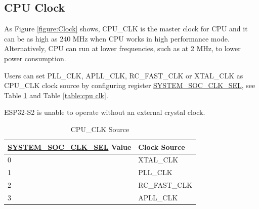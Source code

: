 \documentclass[main\_\_EN.tex]{subfiles}
\begin{document}
\subsection{CPU Clock}
\label{sec:cpu-clock}
As Figure \ref{figure:Clock} shows, CPU\_CLK is the master clock for CPU and it can be as high as 240 MHz when CPU works in high performance mode. Alternatively, CPU can run at lower frequencies, such as at 2 MHz, to lower power consumption.

Users can set PLL\_CLK, APLL\_CLK, RC\_FAST\_CLK or XTAL\_CLK as CPU\_CLK clock source by configuring register \hyperref[fielddesc:SYSTEMSOCCLKSEL]{SYSTEM\_SOC\_CLK\_SEL}, see Table \ref{table:cpu clksrc} and Table \ref{table:cpu clk}.

\begin{tiplisting}
ESP32-S2 is unable to operate without an external crystal clock.
\end{tiplisting}

\begin{longtable}[c]{|p{8.5cm}|p{7.3cm}| }
       \caption{CPU\_CLK Source}
		\label{table:cpu clksrc} \\
	    \hline
        \rowcolor{lightgray}
        \hyperref[fielddesc:SYSTEMSOCCLKSEL]{SYSTEM\_SOC\_CLK\_SEL} Value & Clock Source \\
        \hline
        0 & XTAL\_CLK \\
        \hline
        1 & PLL\_CLK \\
        \hline
        2 & RC\_FAST\_CLK \\
        \hline
        3 & APLL\_CLK \\
        \hline
\end{longtable}
\end{document}
